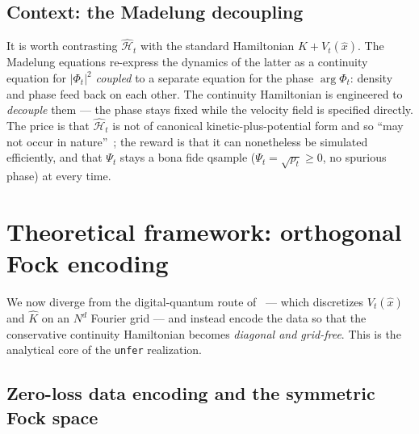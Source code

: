 \documentclass[11pt, a4paper]{article}
\newcommand{\Hgen}{\hat{\mathcal{H}}}
\newcommand{\Kop}{\hat{K}}
\begin{document}
\subsection{Context: the Madelung decoupling}

It is worth contrasting $\Hgen_t$ with the standard Hamiltonian
$\Kop+V_t(\hat x)$. The Madelung equations re-express the dynamics of the
latter as a continuity equation for $|\Phi_t|^2$ \emph{coupled} to a separate
equation for the phase $\arg\Phi_t$: density and phase feed back on each other.
The continuity Hamiltonian is engineered to \emph{decouple} them --- the phase
stays fixed while the velocity field is specified directly. The price is that
$\Hgen_t$ is not of canonical kinetic-plus-potential form and so ``may not occur
in nature''~\cite{Layden2025}; the reward is that it can nonetheless be
simulated efficiently, and that $\Psi_t$ stays a bona fide qsample
($\Psi_t=\sqrt{p_t}\ge 0$, no spurious phase) at every time.

\section{Theoretical framework: orthogonal Fock encoding}
\label{sec:framework}

We now diverge from the digital-quantum route of~\cite{Layden2025} --- which
discretizes $V_t(\hat x)$ and $\Kop$ on an $N^d$ Fourier grid --- and instead
encode the data so that the conservative continuity Hamiltonian becomes
\emph{diagonal and grid-free}. This is the analytical core of the
\texttt{unfer} realization.

\subsection{Zero-loss data encoding and the symmetric Fock space}
\end{document}
